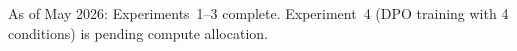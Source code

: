 \documentclass[11pt]{article}
\begin{document}
\noindent As of May 2026: Experiments~1--3 complete. Experiment~4 (DPO training with 4 conditions) is pending compute allocation.




\end{document}
